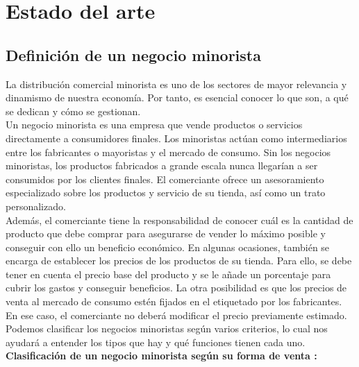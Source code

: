 \chapter{Estado del arte}
\label{chap:EstadoArte}

\section{Definición de un negocio minorista}

La distribución comercial minorista es uno de los sectores de mayor relevancia y dinamismo de nuestra economía. Por tanto, es esencial conocer lo que son, a qué se dedican y cómo se gestionan. \\


Un negocio minorista es una empresa que vende productos o servicios directamente a consumidores finales. Los minoristas actúan como intermediarios entre los fabricantes o mayoristas y el mercado de consumo. Sin los negocios minoristas, los productos fabricados a grande escala nunca llegarían a ser consumidos por los clientes finales. El comerciante ofrece un asesoramiento especializado sobre los productos y servicio de su tienda, así como un trato personalizado. \cite{gestionModerna} \\


Además, el comerciante tiene la responsabilidad de conocer cuál es la cantidad de producto que debe comprar para asegurarse de vender lo máximo posible y conseguir con ello un beneficio económico. En algunas ocasiones, también se encarga de establecer los precios de los productos de su tienda. Para ello, se debe tener en cuenta el precio base del producto y se le añade un porcentaje para cubrir los gastos y conseguir beneficios. La otra posibilidad es que los precios de venta al mercado de consumo estén fijados en el etiquetado por los fabricantes. En ese caso, el comerciante no deberá modificar el precio previamente estimado. \\


Podemos clasificar los negocios minoristas según varios criterios, lo cual nos ayudará a entender los tipos que hay y qué funciones tienen cada uno. \\

\textbf{Clasificación de un negocio minorista según su forma de venta \cite{gestionNegocio}: }

